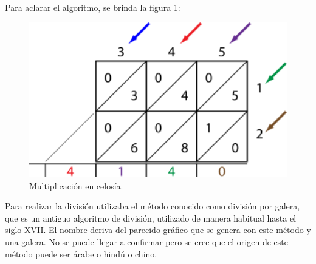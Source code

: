 \documentclass[a4paper, 11pt]{article}
\begin{document}
		Para aclarar el algoritmo, se brinda la figura \ref{fig:ind_multiplication}:

		\begin{figure}[!ht]
			\centering
			\includegraphics[width = 14cm]{indian_multiplication.png}
			\caption{Multiplicación en celosía.}
			\label{fig:ind_multiplication}
		\end{figure}
		
		Para realizar la división utilizaba el método conocido como división por galera, que es un antiguo algoritmo de
		división, utilizado de manera habitual hasta el siglo XVII. El nombre deriva del parecido gráfico que se genera
		con este método y una galera. No se puede llegar a confirmar pero se cree que el origen de este método puede ser
		árabe o hindú o chino.
		
\end{document}
